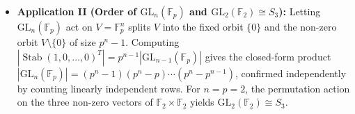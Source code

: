\begin{overview}
\begin{itemize}
    \item \textbf{Application II (Order of $\mathrm{GL}_n(\mathbb{F}_p)$ and $\mathrm{GL}_2(\mathbb{F}_2) \cong S_3$):} Letting $\mathrm{GL}_n(\mathbb{F}_p)$ act on $V = \mathbb{F}_p^n$ splits $V$ into the fixed orbit $\{0\}$ and the non-zero orbit $V \setminus \{0\}$ of size $p^n - 1$. Computing $\left|\operatorname{Stab}(1, 0, \dots, 0)^T\right| = p^{n-1} \left|\mathrm{GL}_{n-1}(\mathbb{F}_p)\right|$ gives the closed-form product $\left|\mathrm{GL}_n(\mathbb{F}_p)\right| = (p^n - 1)(p^n - p)\cdots(p^n - p^{n-1})$, confirmed independently by counting linearly independent rows. For $n = p = 2$, the permutation action on the three non-zero vectors of $\mathbb{F}_2 \times \mathbb{F}_2$ yields $\mathrm{GL}_2(\mathbb{F}_2) \cong S_3$.
\end{itemize}
\end{overview}